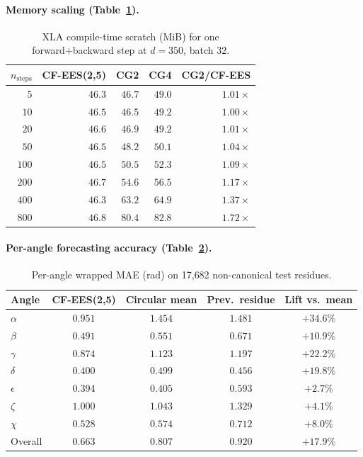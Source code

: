 \documentclass{article}
\theoremstyle{definition}
\theoremstyle{remark}
\begin{document}
\paragraph{Memory scaling (Table~\ref{tab:torus_scaling}).}
\begin{table}[h]
\centering
\small
\caption{XLA compile-time scratch (MiB) for one forward+backward step at $d = 350$, batch $32$.}
\label{tab:torus_scaling}
\begin{tabular}{r rrr r}
\toprule
$n_{\mathrm{steps}}$ & CF-EES(2,5) & CG2 & CG4 & CG2/CF-EES \\
\midrule
  $5$   & $\mathbf{46.3}$ & $46.7$ & $49.0$ & $1.01\times$ \\
 $10$   & $\mathbf{46.5}$ & $46.5$ & $49.2$ & $1.00\times$ \\
 $20$   & $\mathbf{46.6}$ & $46.9$ & $49.2$ & $1.01\times$ \\
 $50$   & $\mathbf{46.5}$ & $48.2$ & $50.1$ & $1.04\times$ \\
$100$   & $\mathbf{46.5}$ & $50.5$ & $52.3$ & $1.09\times$ \\
$200$   & $\mathbf{46.7}$ & $54.6$ & $56.5$ & $1.17\times$ \\
$400$   & $\mathbf{46.3}$ & $63.2$ & $64.9$ & $1.37\times$ \\
$800$   & $\mathbf{46.8}$ & $80.4$ & $82.8$ & $1.72\times$ \\
\bottomrule
\end{tabular}
\end{table}

\paragraph{Per-angle forecasting accuracy (Table~\ref{tab:torus_mae}).}
\begin{table}[h]
\centering
\small
\caption{Per-angle wrapped MAE (rad) on 17{,}682 non-canonical test residues.}
\label{tab:torus_mae}
\begin{tabular}{l ccc c}
\toprule
Angle & CF-EES(2,5) & Circular mean & Prev.\ residue & Lift vs.\ mean \\
\midrule
$\alpha$   & $\mathbf{0.951}$ & $1.454$ & $1.481$ & $+34.6\%$ \\
$\beta$    & $\mathbf{0.491}$ & $0.551$ & $0.671$ & $+10.9\%$ \\
$\gamma$   & $\mathbf{0.874}$ & $1.123$ & $1.197$ & $+22.2\%$ \\
$\delta$   & $\mathbf{0.400}$ & $0.499$ & $0.456$ & $+19.8\%$ \\
$\epsilon$ & $\mathbf{0.394}$ & $0.405$ & $0.593$ & $+2.7\%$  \\
$\zeta$    & $\mathbf{1.000}$ & $1.043$ & $1.329$ & $+4.1\%$  \\
$\chi$     & $\mathbf{0.528}$ & $0.574$ & $0.712$ & $+8.0\%$  \\
\midrule
Overall    & $\mathbf{0.663}$ & $0.807$ & $0.920$ & $+17.9\%$ \\
\bottomrule
\end{tabular}
\end{table}
\end{document}
